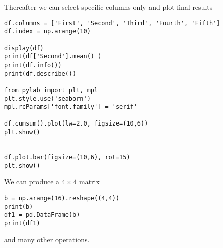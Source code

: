 \documentclass[%
oneside,                 %
final,                   %
10pt]{article}
\begin{document}
Thereafter we can select specific columns only and plot final results
\begin{verbatim}
df.columns = ['First', 'Second', 'Third', 'Fourth', 'Fifth']
df.index = np.arange(10)

display(df)
print(df['Second'].mean() )
print(df.info())
print(df.describe())

from pylab import plt, mpl
plt.style.use('seaborn')
mpl.rcParams['font.family'] = 'serif'

df.cumsum().plot(lw=2.0, figsize=(10,6))
plt.show()


df.plot.bar(figsize=(10,6), rot=15)
plt.show()
\end{verbatim}
We can produce a $4\times 4$ matrix
\begin{verbatim}
b = np.arange(16).reshape((4,4))
print(b)
df1 = pd.DataFrame(b)
print(df1)
\end{verbatim}
and many other operations. 


\end{document}
